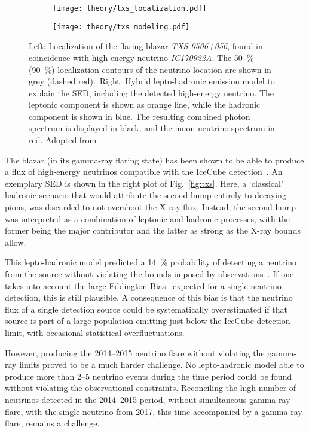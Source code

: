 \begin{figure}[htb]
    \centering
    \begin{subfigure}[b]{0.47\textwidth}
        \centering
        \texttt{[image: theory/txs\_localization.pdf]}
    \end{subfigure}
    \begin{subfigure}[b]{0.52\textwidth}
        \centering
        \texttt{[image: theory/txs\_modeling.pdf]}
    \end{subfigure}
    \caption[TXS 0506+056: Localization and SED]{Left: Localization of the flaring blazar \emph{TXS 0506+056}, found in coincidence with high-energy neutrino \emph{IC170922A}. The \SI{50}{\percent} (\SI{90}{\percent}) localization contours of the neutrino location are shown in grey (dashed red).\ Right: Hybrid lepto-hadronic emission model to explain the SED, including the detected high-energy neutrino. The leptonic component is shown as orange line, while the hadronic component is shown in blue. The resulting combined photon spectrum is displayed in black, and the muon neutrino spectrum in red. Adopted from~\cite{Aartsen2018, Gao2018}.}
\end{figure}

The blazar (in its gamma-ray flaring state) has been shown to be able to produce a flux of high-energy neutrinos compatible with the IceCube detection~. An exemplary SED is shown in the right plot of Fig.~\ref{fig:txs}. Here, a `classical' hadronic scenario that would attribute the second hump entirely to decaying pions, was discarded to not overshoot the X-ray flux. Instead, the second hump was interpreted as a combination of leptonic and hadronic processes, with the former being the major contributor and the latter as strong as the X-ray bounds allow.

This lepto-hadronic model predicted a \SI{14}{\percent} probability of detecting a neutrino from the source without violating the bounds imposed by observations~\cite{Gao2018}. If one takes into account the large Eddington Bias~ expected for a single neutrino detection, this is still plausible. A consequence of this bias is that the neutrino flux of a single detection source could be systematically overestimated if that source is part of a large population emitting just below the IceCube detection limit, with occasional statistical overfluctuations.

However, producing the 2014--2015 neutrino flare without violating the gamma-ray limits proved to be a much harder challenge. No lepto-hadronic model able to produce more than 2--5 neutrino events during the time period could be found~ without violating the observational constraints. Reconciling the high number of neutrinos detected in the 2014--2015 period, without simultaneous gamma-ray flare, with the single neutrino from 2017, this time accompanied by a gamma-ray flare, remains a challenge.

